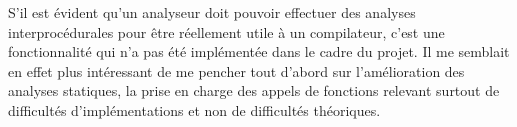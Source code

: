 \documentclass[paper=a4, fontsize=11pt]{scrartcl}
\numberwithin{figure}{section}			%
\numberwithin{table}{section}				%
\begin{document}
S'il est évident qu'un analyseur doit pouvoir effectuer des analyses interprocédurales pour être réellement utile à un compilateur, c'est une fonctionnalité qui n'a pas été implémentée dans le cadre du projet. Il me semblait en effet plus intéressant de me pencher tout d'abord sur l'amélioration des analyses statiques, la prise en charge des appels de fonctions relevant surtout de difficultés d'implémentations et non de difficultés théoriques.
\end{document}
